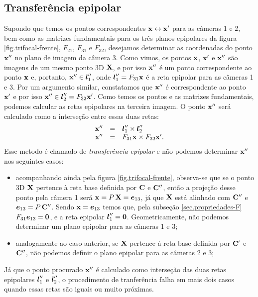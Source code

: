 \subsection{Transferência epipolar}\label{sec.trans-epipolar}
Supondo que temos os pontos correspondentes $\mathbf{x}\leftrightarrow\mathbf{x}'$ para as câmeras 1 e 2, bem como as matrizes fundamentais para os três planos epipolares da figura \ref{fig.trifocal-frente}, $F_{21}$, $F_{31}$ e $F_{32}$, desejamos determinar as coordenadas do ponto $\mathbf{x}''$ no plano de imagem da câmera 3. Como vimos, os pontos $\mathbf{x}$, $\mathbf{x}'$ e $\mathbf{x}''$ são imagens de um mesmo ponto 3D $\mathbf{X}$, e por isso $\mathbf{x}''$ é um ponto correspondente ao ponto $\mathbf{x}$ e, portanto, $\mathbf{x}''\in\boldsymbol{l}''_1$, onde $\boldsymbol{l}''_1=F_{31}\mathbf{x}$ é a reta epipolar para as câmeras 1 e 3. Por um argumento similar, constatamos que $\mathbf{x}''$ é correspondente ao ponto $\mathbf{x}'$ e por isso $\mathbf{x}''\in\boldsymbol{l}''_2=F_{32}\mathbf{x}'$. Como temos os pontos e as matrizes fundamentais, podemos calcular as retas epipolares na terceira imagem. O ponto $\mathbf{x}''$ será calculado como a interseção entre essas duas retas:
\begin{equation}
\begin{array}{rcl}
\mathbf{x}''&=&\boldsymbol{l}''_1\times\boldsymbol{l}''_2\\
\mathbf{x}''&=&F_{31}\mathbf{x}\times F_{32}\mathbf{x}'.
\end{array}
\end{equation}
Esse metodo é chamado de {\it transferência epipolar} e não podemos determinar $\mathbf{x}''$ nos seguintes casos:
\begin{itemize}
\item acompanhando ainda pela figura \ref{fig.trifocal-frente}, observa-se que se o ponto 3D $\mathbf{X}$ pertence à reta base definida por ${\bf C}$ e ${\bf C}''$, então a projeção desse ponto pela câmera 1 será $\mathbf{x}=P\,\mathbf{X}=\boldsymbol{e}_{13}$, já que $\mathbf{X}$ está alinhado com ${\bf C}''$ e $\boldsymbol{e}_{13}=P\,{\bf C}''$. Sendo $\mathbf{x}=\boldsymbol{e}_{13}$ temos que, pela subseção \ref{sec.propriedades-F} $F_{31}\boldsymbol{e}_{13}={\bf 0}$, e a reta epipolar $\boldsymbol{l}''_1={\bf 0}$. Geometricamente, não podemos determinar um plano epipolar para as câmeras 1 e 3;
\item analogamente ao caso anterior, se $\mathbf{X}$ pertence à reta base definida por ${\bf C}'$ e ${\bf C}''$, não podemos definir o plano epipolar para as câmeras 2 e 3;\\
\end{itemize}

Já que o ponto procurado $\mathbf{x}''$ é calculado como interseção das duas retas epipolares $\boldsymbol{l}''_1$ e $\boldsymbol{l}''_2$, o procedimento de tranferência falha em mais dois casos quando essas retas são iguais ou muito próximas.

